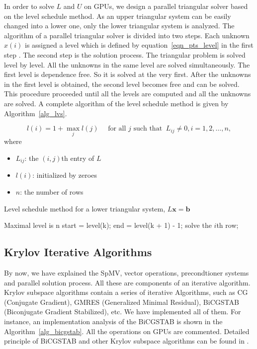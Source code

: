 \documentclass[runningheads,a4paper]{llncs}
\newcommand{\vect}[1]{\boldsymbol{#1}}
\begin{document}
{In order to solve $L$ and $U$ on GPUs, we design a parallel triangular solver based on the level schedule method. As an upper triangular system can be easily changed into a lower one, only the lower triangular system is analyzed. The algorithm of a parallel triangular solver is divided into two steps. Each unknown $x(i)$ is assigned a level which is defined by equation~\eqref{eqn_pts_level} in the first step \cite{saad}. The second step is the solution process. The triangular problem is solved level by level. All the unknowns in the same level are solved simultaneously. The first level is dependence free. So it is solved at the very first. After the unknowns in the first level is obtained, the second level becomes free and can be solved. This procedure proceeded until all the levels are computed and all the unknowns are solved. A complete algorithm of the level schedule method is given by Algorithm~\ref{alg_lvs}.

\begin{equation}
\label{eqn_pts_level}
 l(i) = 1 + \max_j {l(j)} \quad \text{ for  all } j \text{ such
that } \ L_{ij} \neq 0, i = 1, 2, \ldots, n,
\end{equation}
where
\begin{itemize}\itemsep1pt \parskip0pt 
  \item $L_{ij}$: the $(i, j)$th entry of $L$
  \item $l(i)$: initialized by zeroes
  \item $n$: the number of rows
\end{itemize}

\begin{algorithm}\caption{Level schedule method for a lower triangular system, $L\vect{x} = \vect{b}$}
\label{alg_lvs}
\begin{algorithmic}[1]
\State Maximal level is n
  \State start = level(k);
  \State end = level(k + 1) - 1;
  \State solve the $i$th row;
  \EndFor
\EndFor

\end{algorithmic}
\end{algorithm}

\subsection{Krylov Iterative Algorithms}
By now, we have explained the SpMV, vector operations, precondtioner systems and parallel solution process. All these are components of an iterative algorithm. Krylov subspace algorithms contain a series of iterative Algorithms, such as CG (Conjugate Gradient), GMRES (Generalized Minimal Residual), BiCGSTAB (Biconjugate Gradient Stabilized), etc. We have implemented all of them. For instance, an implementation analysis of the BiCGSTAB is shown in the Algorithm~\ref{alg_bicgstab}. All the operations on GPUs are commented. Detailed principle of BiCGSTAB and other Krylov subspace algorithms can be found in \cite{saad,template}.

}
\end{document}
